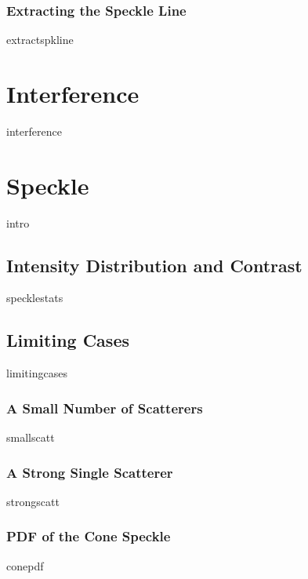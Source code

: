 \documentclass[12pt,a4paper,titlepage,onecolumn]{report}
\begin{document}
\subsection{Extracting the Speckle Line}\label{sec:spkline}
{extractspkline}

\chapter{Interference}\label{ch:interference}
{interference}

\chapter{Speckle}\label{ch:speckle}
{intro}
\section{Intensity Distribution and Contrast}
{specklestats}
\section{Limiting Cases}
{limitingcases}
\subsection{A Small Number of Scatterers}
{smallscatt}
\subsection{A Strong Single Scatterer}
{strongscatt}
\subsection{PDF of the Cone Speckle}
{conepdf}
\end{document}
